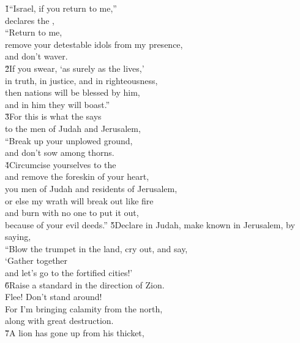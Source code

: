 \begin{poetry}
\poeml {}
\v{1}``Israel, if you return to me,'' \\
\poeml declares the , \\
\poeml ``Return to me, \\
\poemll    remove your detestable idols from my presence, \\
\poemlll       and don't waver. \\
\poeml \v{2}If you swear, `as surely as the  lives,' \\
\poemll    in truth, in justice, and in righteousness, \\
\poeml then nations will be blessed by him, \\
\poemll    and in him they will boast.'' \\
\poeml \v{3}For this is what the  says \\
\poemll    to the men of Judah and Jerusalem, \\
\poeml ``Break up your unplowed ground, \\
\poemll    and don't sow among thorns. \\
\poeml \v{4}Circumcise yourselves to the  \\
\poemll    and remove the foreskin of your heart, \\
\poeml you men of Judah and residents of Jerusalem, \\
\poemll    or else my wrath will break out like fire \\
\poeml and burn with no one to put it out, \\
\poemll    because of your evil deeds.''
\poeml \v{5}Declare in Judah, make known in Jerusalem, by saying, \\
\poemll    ``Blow the trumpet in the land, cry out, and say, \\
\poeml `Gather together \\
\poemll    and let's go to the fortified cities!' \\
\poeml \v{6}Raise a standard in the direction of Zion. \\
\poemll    Flee! Don't stand around! \\
\poeml For I'm bringing calamity from the north, \\
\poemll    along with great destruction. \\
\poeml \v{7}A lion has gone up from his thicket, \\

\end{poetry}
